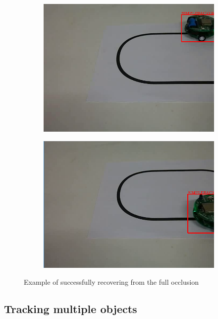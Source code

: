 \begin{figure}
\centering
\begin{subfigure}{0.48\linewidth}
\includegraphics[width=\linewidth]{img/experiments/occlusion1.png}
\end{subfigure}
\begin{subfigure}{0.48\linewidth}
\includegraphics[width=\linewidth]{img/experiments/occlusion2.png}
\end{subfigure}
\caption{Example of successfully recovering from the full occlusion}
\label{fig:occlusion}
\end{figure}

\subsection{Tracking multiple objects}


